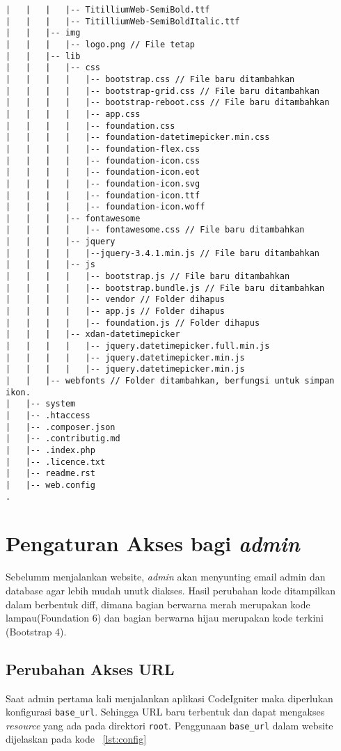 \begin{lstlisting}[basicstyle=\ttfamily, frame=single, caption=Perubahan isi folder BlueTape,
columns=fullflexible, keepspaces=true, breaklines=true, label={lst:daftarfile}]
|   |   |   |-- TitilliumWeb-SemiBold.ttf
|   |   |   |-- TitilliumWeb-SemiBoldItalic.ttf
|   |   |-- img
|   |   |   |-- logo.png // File tetap
|   |   |-- lib 
|   |   |   |-- css
|   |   |   |   |-- bootstrap.css // File baru ditambahkan
|   |   |   |   |-- bootstrap-grid.css // File baru ditambahkan
|   |   |   |   |-- bootstrap-reboot.css // File baru ditambahkan
|   |   |   |   |-- app.css 
|   |   |   |   |-- foundation.css 
|   |   |   |   |-- foundation-datetimepicker.min.css 
|   |   |   |   |-- foundation-flex.css 
|   |   |   |   |-- foundation-icon.css 
|   |   |   |   |-- foundation-icon.eot 
|   |   |   |   |-- foundation-icon.svg 
|   |   |   |   |-- foundation-icon.ttf 
|   |   |   |   |-- foundation-icon.woff 
|   |   |   |-- fontawesome
|   |   |   |   |-- fontawesome.css // File baru ditambahkan
|   |   |   |-- jquery
|   |   |   |   |--jquery-3.4.1.min.js // File baru ditambahkan
|   |   |   |-- js
|   |   |   |   |-- bootstrap.js // File baru ditambahkan
|   |   |   |   |-- bootstrap.bundle.js // File baru ditambahkan
|   |   |   |   |-- vendor // Folder dihapus
|   |   |   |   |-- app.js // Folder dihapus
|   |   |   |   |-- foundation.js // Folder dihapus
|   |   |   |-- xdan-datetimepicker 
|   |   |   |   |-- jquery.datetimepicker.full.min.js
|   |   |   |   |-- jquery.datetimepicker.min.js
|   |   |   |   |-- jquery.datetimepicker.min.js
|   |   |-- webfonts // Folder ditambahkan, berfungsi untuk simpan ikon.
|   |-- system
|   |-- .htaccess
|   |-- .composer.json
|   |-- .contributig.md
|   |-- .index.php
|   |-- .licence.txt
|   |-- readme.rst
|   |-- web.config
.
\end{lstlisting}

\section{Pengaturan Akses bagi \textit{admin}}
Sebelumm menjalankan website, \textit{admin} akan menyunting email admin dan database agar lebih mudah unutk diakses. Hasil perubahan kode ditampilkan dalam berbentuk diff, dimana bagian berwarna merah merupakan kode lampau(Foundation 6) dan bagian berwarna hijau merupakan kode terkini  (Bootstrap 4).

\subsection{Perubahan Akses URL}
Saat admin pertama kali menjalankan aplikasi CodeIgniter maka diperlukan konfigurasi \texttt{base\_url}. Sehingga URL baru terbentuk dan dapat mengakses \textit{resource} yang ada pada direktori \texttt{root}. Penggunaan \texttt{base\_url} dalam website dijelaskan pada kode ~\ref{lst:config}\\

